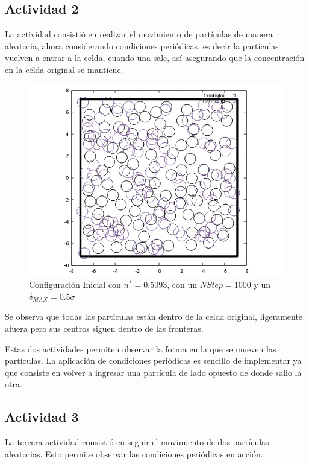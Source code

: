 \documentclass[12pt,letterpaper]{article}
\begin{document}
\subsection*{Actividad 2}
La actividad consistió en realizar el movimiento de partículas de manera aleatoria, ahora considerando condiciones periódicas, es decir la partículas vuelven a entrar a la celda, cuando una sale, así asegurando que la concentración en la celda original se mantiene.
\begin{figure}[H]
		\centering
		\includegraphics[scale=0.75]{Config_INI_FIN}
		\caption{Configuración Inicial con $n^*=0.5093$, con un $NStep=1000$ y un $\delta_{MAX}=0.5\sigma$}
	\end{figure}
Se observa que todas las partículas están dentro de la celda original, ligeramente afuera pero sus centros siguen dentro de las fronteras. 

Estas dos actividades permiten observar la forma en la que se mueven las partículas. La aplicación de condiciones periódicas es sencillo de implementar ya que consiste en volver a ingresar una partícula de lado opuesto de donde salio la otra.
\subsection*{Actividad 3}
La tercera actividad consistió en seguir el movimiento de dos partículas aleatorias. Esto permite observar las condiciones periódicas en acción.
\end{document}
